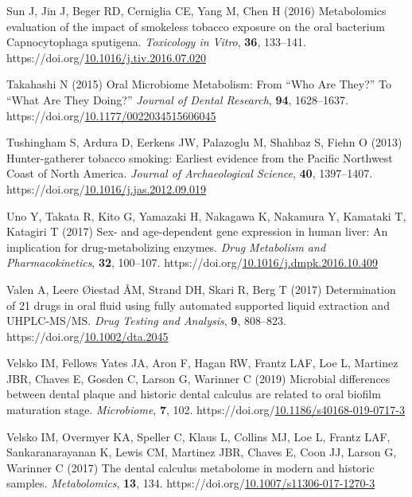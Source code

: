 \documentclass[
  11pt,
  leqno]{scrartcl}
\newlength{\cslhangindent}
\newenvironment{CSLReferences}[2] %
 {\begin{list}{}{%
  \setlength{\itemindent}{0pt}
  \setlength{\leftmargin}{0pt}
  \setlength{\parsep}{0pt}
  \ifodd #1
   \setlength{\leftmargin}{\cslhangindent}
   \setlength{\itemindent}{-1\cslhangindent}
  \fi
  \setlength{\itemsep}{#2\baselineskip}}}
 {\end{list}}
\begin{document}
\begin{CSLReferences}{1}{0}
Sun J, Jin J, Beger RD, Cerniglia CE, Yang M, Chen H (2016) Metabolomics
evaluation of the impact of smokeless tobacco exposure on the oral
bacterium {Capnocytophaga} sputigena. \emph{Toxicology in Vitro},
\textbf{36}, 133--141.
https://doi.org/\href{https://doi.org/10.1016/j.tiv.2016.07.020}{10.1016/j.tiv.2016.07.020}

Takahashi N (2015) Oral {Microbiome Metabolism}: {From} {``{Who Are
They}?''} To {``{What Are They Doing}?''} \emph{Journal of Dental
Research}, \textbf{94}, 1628--1637.
https://doi.org/\href{https://doi.org/10.1177/0022034515606045}{10.1177/0022034515606045}

Tushingham S, Ardura D, Eerkens JW, Palazoglu M, Shahbaz S, Fiehn O
(2013) Hunter-gatherer tobacco smoking: Earliest evidence from the
{Pacific Northwest Coast} of {North America}. \emph{Journal of
Archaeological Science}, \textbf{40}, 1397--1407.
https://doi.org/\href{https://doi.org/10.1016/j.jas.2012.09.019}{10.1016/j.jas.2012.09.019}

Uno Y, Takata R, Kito G, Yamazaki H, Nakagawa K, Nakamura Y, Kamataki T,
Katagiri T (2017) Sex- and age-dependent gene expression in human liver:
{An} implication for drug-metabolizing enzymes. \emph{Drug Metabolism
and Pharmacokinetics}, \textbf{32}, 100--107.
https://doi.org/\href{https://doi.org/10.1016/j.dmpk.2016.10.409}{10.1016/j.dmpk.2016.10.409}

Valen A, Leere Øiestad ÅM, Strand DH, Skari R, Berg T (2017)
Determination of 21 drugs in oral fluid using fully automated supported
liquid extraction and {UHPLC-MS}/{MS}. \emph{Drug Testing and Analysis},
\textbf{9}, 808--823.
https://doi.org/\href{https://doi.org/10.1002/dta.2045}{10.1002/dta.2045}

Velsko IM, Fellows Yates JA, Aron F, Hagan RW, Frantz LAF, Loe L,
Martinez JBR, Chaves E, Gosden C, Larson G, Warinner C (2019) Microbial
differences between dental plaque and historic dental calculus are
related to oral biofilm maturation stage. \emph{Microbiome}, \textbf{7},
102.
https://doi.org/\href{https://doi.org/10.1186/s40168-019-0717-3}{10.1186/s40168-019-0717-3}

Velsko IM, Overmyer KA, Speller C, Klaus L, Collins MJ, Loe L, Frantz
LAF, Sankaranarayanan K, Lewis CM, Martinez JBR, Chaves E, Coon JJ,
Larson G, Warinner C (2017) The dental calculus metabolome in modern and
historic samples. \emph{Metabolomics}, \textbf{13}, 134.
https://doi.org/\href{https://doi.org/10.1007/s11306-017-1270-3}{10.1007/s11306-017-1270-3}


\end{CSLReferences}
\end{document}
